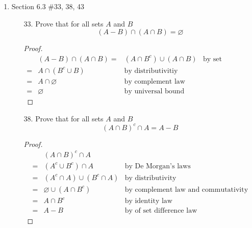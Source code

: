 \documentclass[12pt]{article}
\newcommand{\paren}[1]{\left( #1 \right)}
\begin{document}
\begin{enumerate}
    \newpage
    \item Section 6.3 \#33, 38, 43
            \begin{enumerate}
                \item[33.] Prove that for all sets $A$ and $B$
                    \[
                    \paren{A - B} \cap \paren{A \cap B} = \varnothing
                    \]
                    \begin{proof}
                        \begin{align*}
                             &\paren{A - B} \cap \paren{A \cap B}
                            =&\paren{A \cap B^c} \cup \paren{A \cap B} &\text{by set difference law}\\
                            =& A \cap \paren{B^c \cup B} & \text{by distributivitiy}\\
                            =& A \cap \varnothing & \text{by complement law}\\
                            =& \varnothing & \text{by universal bound law}
                        \end{align*}
                    \end{proof}
                \item[38.] Prove that for all sets $A$ and $B$
                    \[
                    \paren{A \cap B}^c \cap A = A - B
                    \]
                    \begin{proof}
                        \begin{align*}
                             &(A \cap B)^c \cap A \\
                            =& (A^c \cup B^c) \cap A & \text{by De Morgan's laws} \\
                            =& (A^c \cap A) \cup (B^c \cap A) & \text{by distributivity} \\
                            =& \varnothing \cup (A \cap B^c) & \text{by complement law and commutativity} \\
                            =& A \cap B^c & \text{by identity law} \\
                            =& A - B & \text{by of set difference law}
                        \end{align*}
                    \end{proof}



\end{enumerate}
\end{enumerate}
\end{document}
